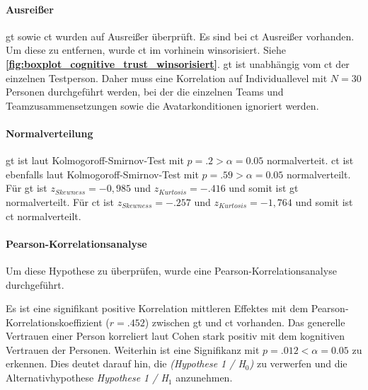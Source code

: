 \documentclass[a4paper,11pt]{article}%
\renewcommand{\\}{\vspace*{0.5\baselineskip} \newline}
\begin{document}
\paragraph{Ausreißer}
\ac{gt} sowie \ac{ct} wurden auf Ausreißer überprüft. 
Es sind bei \ac{ct} Ausreißer vorhanden. Um diese zu entfernen, wurde \ac{ct} im vorhinein winsorisiert. Siehe \textbf{\autoref{fig:boxplot_cognitive_trust_winsorisiert}}. 
\ac{gt} ist unabhängig vom \ac{ct} der einzelnen Testperson. Daher muss eine Korrelation auf Individuallevel mit $N=30$ Personen durchgeführt werden, bei der die einzelnen Teams und Teamzusammensetzungen sowie die Avatarkonditionen ignoriert werden. 

\paragraph{Normalverteilung}
\ac{gt} ist laut Kolmogoroff-Smirnov-Test mit $p = .2 > \alpha = 0.05$ normalverteit. 
\ac{ct} ist ebenfalls laut Kolmogoroff-Smirnov-Test mit $p = .59 > \alpha = 0.05$ normalverteilt. 
Für \ac{gt} ist $ z_{Skewness} = -0,985 $ und $z_{Kurtosis} = -.416$ und somit ist \ac{gt} normalverteilt.
Für \ac{ct} ist $ z_{Skewness} = -.257 $ und $z_{Kurtosis} = -1,764$ und somit ist \ac{ct} normalverteilt.


\paragraph{Pearson-Korrelationsanalyse}
Um diese Hypothese zu überprüfen, wurde eine Pearson-Korrelationsanalyse durchgeführt. 

	
Es ist eine signifikant positive Korrelation mittleren Effektes mit dem Pearson-Korrelationskoeffizient ($r = .452$) zwischen \ac{gt} und \ac{ct} vorhanden. 
Das generelle Vertrauen einer Person korreliert  laut Cohen \cite{cohen2013statistical} stark positiv mit dem kognitiven Vertrauen der Personen.
Weiterhin ist eine Signifikanz mit $p = .012 < \alpha = 0.05$ zu erkennen. Dies deutet darauf hin, die \textit{(Hypothese 1 / H$_{0}$)} zu verwerfen und die Alternativhypothese \textit{Hypothese 1 / H$_{1}$} anzunehmen.
\end{document}
